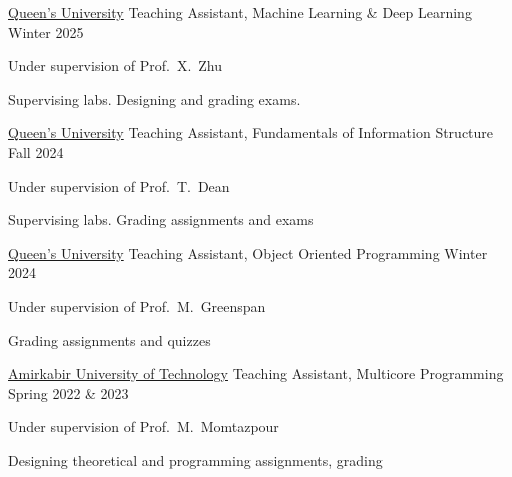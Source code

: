 \begin{cventries}

\cventry
    {\href{https://www.queensu.ca/}{Queen's University}} %
    {Teaching Assistant, Machine Learning \& Deep Learning} %
    {} %
    {Winter 2025} %
    {
      \begin{cvitems} %
        \item {Under supervision of Prof.~X.~Zhu}
        \item {Supervising labs. Designing and grading exams.}
      \end{cvitems}
    }

\cventry
    {\href{https://www.queensu.ca/}{Queen's University}} %
    {Teaching Assistant, Fundamentals of Information Structure} %
    {} %
    {Fall 2024} %
    {
      \begin{cvitems} %
        \item {Under supervision of Prof.~T.~Dean}
        \item {Supervising labs. Grading assignments and exams}
      \end{cvitems}
    }


\cventry
    {\href{https://www.queensu.ca/}{Queen's University}} %
    {Teaching Assistant, Object Oriented Programming} %
    {} %
    {Winter 2024} %
    {
      \begin{cvitems} %
        \item {Under supervision of Prof.~M.~Greenspan}
        \item {Grading assignments and quizzes}
      \end{cvitems}
    }

\cventry
    {\href{https://aut.ac.ir/}{Amirkabir University of Technology}} %
    {Teaching Assistant, Multicore Programming} %
    {} %
    {Spring 2022 \& 2023} %
    {
      \begin{cvitems} %
        \item {Under supervision of Prof.~M.~Momtazpour}
        \item {Designing theoretical and programming assignments, grading}
      \end{cvitems}
    }


\end{cventries}

